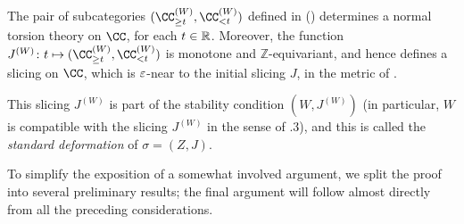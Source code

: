 \begin{theorem}\label{thm:funddefo}
The pair of subcategories $(\CC^{(W)}_{\geq t},\CC^{(W)}_{< t})$ defined in () determines a normal torsion theory on $\CC$, for each $t\in\mathbb{R}$. Moreover, the function $J^{(W)}\colon t\mapsto (\CC^{(W)}_{\geq t},\CC^{(W)}_{< t})$ is monotone and $\mathbb{Z}$-equivariant, and hence defines a slicing on $\CC$, which is $\varepsilon$-near to the initial slicing $J$, in the metric of \adef {}.

This slicing $J^{(W)}$ is part of the stability condition $(W,J^{(W)})$ (in particular, $W$ is compatible with the slicing $J^{(W)}$ in the sense of \adef {}.3), and this is called the \emph{standard deformation} of $\sigma = (Z,J)$.
\end{theorem}
To simplify the exposition of a somewhat involved argument, we split the proof into several preliminary results; the final argument will follow almost directly from all the preceding considerations.

